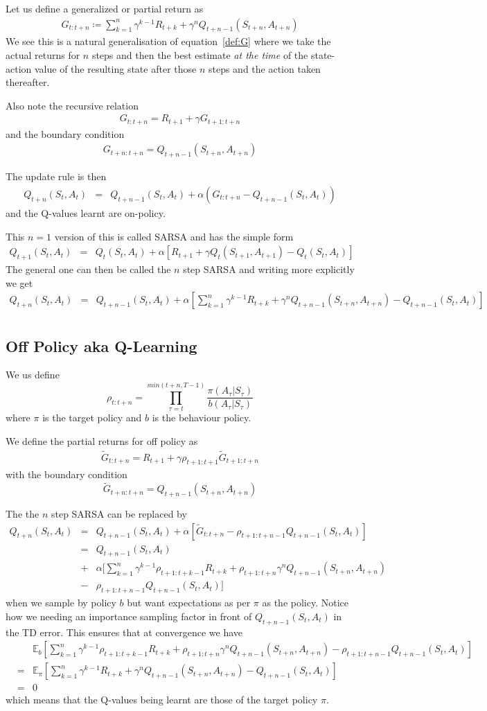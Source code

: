 \documentclass[11pt,a4paper]{article}
\newcommand\be{\begin{equation}}
\newcommand\bea{\begin{eqnarray}}
\newcommand\ee{\end{equation}}
\newcommand\eea{\end{eqnarray}}
\newcommand{\nn}{\nonumber \\}
\newcommand{\e}[2]{\mathbb E_{#2}[#1]}
\begin{document}
Let us define a generalized or partial return as
\bea
G_{t:t+n} \coloneqq \sum_{k=1}^{n} \gamma^{k-1} R_{t+k} + \gamma^n Q_{t+n-1}(S_{t+n},A_{t+n})
\eea
We see this is a natural generalisation of equation~\ref{def:G} where we take the actual returns for $n$ steps and then the best estimate {\em at the time} of the state-action value of the resulting state after those $n$ steps and the action taken thereafter. 

Also note the recursive relation
\bea
G_{t:t+n} = R_{t+1} + \gamma G_{t+1:t+n} 
\eea
and the boundary condition
\bea
G_{t+n:t+n} = Q_{t+n-1}(S_{t+n},A_{t+n})
\eea

The update rule is then
\bea
Q_{t+n} (S_t,A_t)  &=&  Q_{t+n-1}(S_t,A_t) + \alpha (G_{t:t+n} - Q_{t+n-1}(S_t,A_t))
\eea
and the Q-values learnt are on-policy.

This $n=1$ version of this is called SARSA and has the simple form
\bea
Q_{t+1} (S_t,A_t)  &=& Q_{t}(S_t,A_t) + \alpha [R_{t+1} + \gamma Q_t(S_{t+1},A_{t+1}) - Q_{t}(S_t,A_t)]
\eea
The general one can then be called the $n$ step SARSA and writing more explicitly we get
\bea
Q_{t+n} (S_t,A_t)  &=& Q_{t+n-1}(S_t,A_t) + \alpha [\sum_{k=1}^{n} \gamma^{k-1} R_{t+k} + \gamma^n Q_{t+n-1}(S_{t+n},A_{t+n})- Q_{t+n-1}(S_t,A_t) ] \nn
\eea

\subsection{Off Policy aka Q-Learning}

We us define
\be
\rho_{t:t+n} = \prod_{\tau=t}^{min(t+n,T-1)} \frac{\pi(A_\tau|S_\tau)}{b(A_\tau|S_\tau)}
\ee
where $\pi$ is the target policy and $b$ is the behaviour policy.

We define the partial returns for off policy as 
\bea
\tilde G_{t:t+n} = R_{t+1} + \gamma \rho_{t+1:t+1} \tilde G_{t+1:t+n}
\eea
with the boundary condition
\be
\tilde G_{t+n:t+n} = Q_{t+n-1}(S_{t+n},A_{t+n})
\ee

The the $n$ step SARSA can be replaced by
\bea
Q_{t+n} (S_t,A_t) &=& Q_{t+n-1}(S_t,A_t)  + \alpha [ \tilde G_{t:t+n} - \rho_{t+1:t+n-1} Q_{t+n-1}(S_t,A_t)] \nn
&=& Q_{t+n-1}(S_t,A_t) \nn
&+& \alpha \Bigg [\sum_{k=1}^{n} \gamma^{k-1}  \rho_{t+1:t+k-1} R_{t+k}  +  \rho_{t+1:t+n}  \gamma^n Q_{t+n-1}(S_{t+n},A_{t+n})  \nn
&-&  \rho_{t+1:t+n-1} Q_{t+n-1}(S_t,A_t) \Bigg]
\eea
when we sample by policy $b$ but want expectations as per $\pi$ as the policy.  Notice how we needing an importance sampling factor in front of $Q_{t+n-1}(S_t,A_t)$ in the TD error. This ensures that at convergence we have
\bea
&&\e{ \sum_{k=1}^{n} \gamma^{k-1}  \rho_{t+1:t+k-1} R_{t+k}  +  \rho_{t+1:t+n}  \gamma^n Q_{t+n-1}(S_{t+n},A_{t+n})  -  \rho_{t+1:t+n-1} Q_{t+n-1}(S_t,A_t) }{b} \nn
&=& \e{ \sum_{k=1}^{n} \gamma^{k-1} R_{t+k}  +  \gamma^n Q_{t+n-1}(S_{t+n},A_{t+n})  -  Q_{t+n-1}(S_t,A_t) }{\pi} \nn
&=&0
\eea
which means that the Q-values being learnt are those of the target policy $\pi$.
\end{document}

